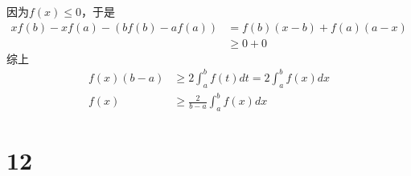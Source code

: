 \documentclass{article}
\begin{document}
\begin{itemize}
        因为$f(x) \leq 0$，于是
        \begin{align*}
          xf(b) - xf(a) - (bf(b) - af(a))
           & = f(b)(x - b) + f(a) (a - x) \\
           & \geq 0 + 0
        \end{align*}
        综上
        \begin{align*}
          f(x) (b - a) & \geq 2 \int_{a}^{b} f(t) dt = 2 \int_{a}^{b} f(x) dx \\
          f(x)         & \geq \frac{2}{b - a} \int_{a}^{b} f(x) dx
        \end{align*}
\end{itemize}

\section*{12}
\end{document}
